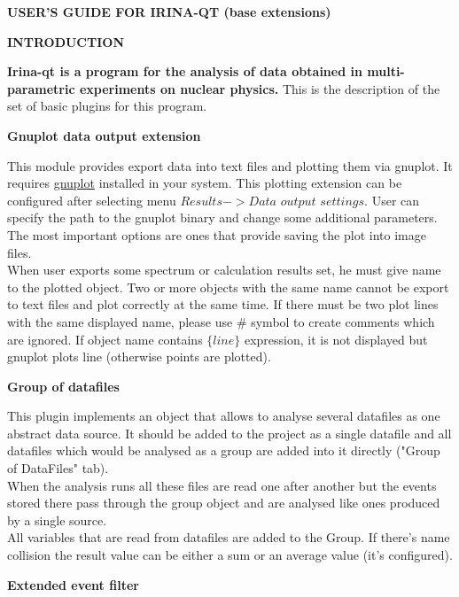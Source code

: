 \documentclass[a4paper]{article}
\begin{document}
\begin{center}{\textbf{\Large USER'S GUIDE FOR IRINA-QT (base extensions)}}\end{center}
%
\begin{center}\textbf{INTRODUCTION}\end{center}
{
\textbf{Irina-qt is a program for the analysis of data obtained in multi-parametric experiments on nuclear physics.} 
This is the description of the set of basic plugins for this program.
}
%
\begin{center}\textbf{Gnuplot data output extension}\end{center}
{
This module provides export data into text files and plotting them via gnuplot.
It requires \href{http://www.gnuplot.info/index.html}{gnuplot} installed in your system.
This plotting extension can be configured after selecting menu $Results->Data$ $output$ $settings$.
User can specify the path to the gnuplot binary and change some additional parameters.
The most important options are ones that provide saving the plot into image files.
\\
When user exports some spectrum or calculation results set, he must give name to the plotted object.
Two or more objects with the same name cannot be export to text files and plot correctly at the same time.
If there must be two plot lines with the same displayed name, please use $\#$ symbol to create comments which are ignored.
If object name contains $\{line\}$ expression, it is not displayed but gnuplot plots line (otherwise points are plotted).
}
\begin{center}\textbf{Group of datafiles}\end{center}
{
This plugin implements an object that allows to analyse several datafiles as one abstract data source.
It should be added to the project as a single datafile and all datafiles which would be analysed as a group are added into it directly ("Group of DataFiles" tab).
\\
When the analysis runs all these files are read one after another but the events stored there pass through the group object and are analysed like ones produced by a single source.
\\
All variables that are read from datafiles are added to the Group.
If there's name collision the result value can be either a sum or an average value (it's configured).
}
%
\hypertarget{extmasks}{\\}
\begin{center}\textbf{Extended event filter}\end{center}
\end{document}
